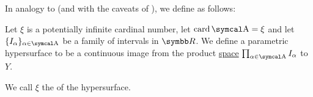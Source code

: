 \begin{definition}\label{def:parametric_hypersurface}
  In analogy to  (and with the caveats of ), we define  as follows:

  Let \( \xi \) is a potentially infinite cardinal number, let \( \Card \CA = \xi \) and let \( \{ I_\alpha \}_{\alpha \in \CA} \) be a family of intervals in \( \BR \). We define a parametric hypersurface to be a continuous image from the product \hyperref[def:topological_product]{space} \( \prod_{\alpha \in \CA} I_\alpha \) to \( Y \).

  We call \( \xi \) the  of the hypersurface.
\end{definition}
